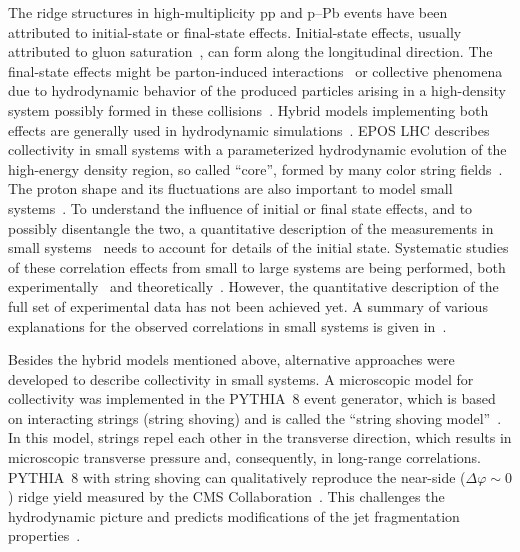 The ridge structures in high-multiplicity pp and p--Pb events have been attributed to initial-state or final-state effects. Initial-state effects, usually attributed to gluon saturation~\cite{Dusling:2012cg,Bzdak:2013zma}, can form along the longitudinal direction. The final-state effects might be parton-induced interactions~\cite{Arbuzov:2011yr} or collective phenomena due to hydrodynamic behavior of the produced particles arising in a high-density system possibly formed in these collisions~\cite{Weller:2017tsr,Zhao:2017rgg}. 
Hybrid models implementing both effects are generally used in hydrodynamic simulations~\cite{Greif:2017bnr,Mantysaari:2017cni}. EPOS LHC describes collectivity in small systems with a parameterized hydrodynamic evolution of the high-energy density region, so called ``core'', formed by many color string fields~\cite{Pierog:2013ria}.
The proton shape and its fluctuations are also important to model small systems~\cite{Mantysaari:2017cni}.
To understand the influence of initial or final state effects, and to possibly disentangle the two, a quantitative description of the measurements in small systems~\cite{Schenke:2019pmk,Schenke:2020mbo} needs to account for details of the initial state.
Systematic studies of these correlation effects from small to large systems are being performed, both experimentally~\cite{Acharya:2019vdf} and theoretically~\cite{Schenke:2020mbo}.
However, the quantitative description of the full set of experimental data has not been achieved yet.
A summary of various explanations for the observed correlations in small systems is given in~\cite{Strickland:2018exs,Loizides:2016tew,Nagle:2018nvi,Loizides:2016tew}.

Besides the hybrid models mentioned above, alternative approaches were developed to describe collectivity in small systems. A microscopic model for collectivity was implemented in the PYTHIA~8 event generator, which is based on interacting strings (string shoving) and is called the “string shoving model”~\cite{Bierlich:2017vhg}. In this model, strings repel each other in the transverse direction, which results in microscopic transverse pressure and, consequently, in long-range correlations. PYTHIA~8 with string shoving can qualitatively reproduce the near-side ($\Delta\varphi\sim0$) ridge yield measured by the CMS Collaboration~\cite{Khachatryan:2016txc}. This challenges the hydrodynamic picture and predicts modifications of the jet fragmentation properties~\cite{Bierlich:2019ixq}.

